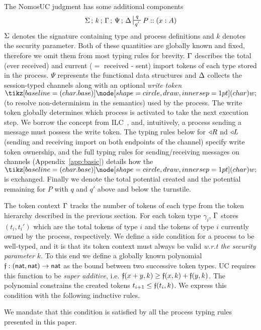 The NomosUC judgment has some additional components
\[
\Sg \semi k \semi \Tokens \semi \Psi \semi \D \entailpot{q}{q'} P :: (x : A)
\]
$\Sigma$ denotes the signature containing type and process definitions and $k$
denotes the security parameter.
Both of these quantities are globally known and fixed, therefore we omit them from
most typing rules for brevity.
$\Gamma$ describes the total (ever received) and current ($=$ received - sent) import tokens
of each type stored in the process.
$\Psi$ represents the functional data structures and $\Delta$ collects the
session-typed channels along with an optional \emph{write token} $\wt$
(to resolve non-determinism in the semantics) used by the process.  
The write token globally determines which process is activated to take the next execution step.
We borrow the concept from ILC~\cite{ilc}, and, intuitively, a process sending a message must possess the write token. 
The typing rules below for $\triangleleft R$ nd $\triangleleft L$ (sending and receiving import on both endpoints of the channel) specify write token ownership, and the full typing rules for sending/receiving messages on channels (Appendix~\ref{app:basic}) details how the $\wt$ is exchanged.
Finally we denote the total potential created and the potential remaining for $P$ with $q$ and $q'$ above and below the turnstile.

The token context $\Gamma$ tracks the number of tokens of each type from the token hierarchy described in the previous section.
For each token type $\gamma_i$, $\Gamma$ stores $(t_i,t_i')$ which are the total tokens of type $i$ and the tokens of type $i$ currently owned by the process, respectively. 
We define a side condition for a process to be well-typed, and it is that its token context must always be valid \emph{w.r.t the security parameter $k$}.
To this end we define a globally known polynomial $\mathfrak{f} : ({\mathsf {nat}}, {\mathsf {nat}}) \rightarrow {\mathsf {nat}}$ as the bound between two successive token types. UC requires this function to be \emph{super additive}, i.e. $\mathfrak{f}(x+y,k) \geq \mathfrak{f}(x,k) + \mathfrak{f}(y,k)$.
The polynomial constrains the created tokens $t_{i+1} \leq \mathfrak{f}(t_i, k)$.
We express this condition with the following inductive rules.
We mandate that this condition is satisfied by all the process typing rules presented in this paper.

